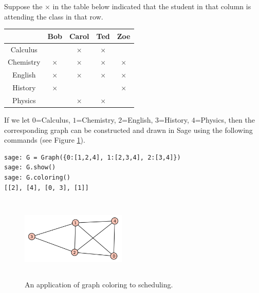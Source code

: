 \begin{example}
\label{eg:coloring}
Suppose the $\times$ in the table below
indicated that the student in that column is attending the class in that
row.

\begin{center}
\begin{tabular}{c|cccc}
                  &  Bob            &  Carol         &       Ted      &    Zoe   \\ \hline
Calculus          &                 &    $\times$   &  $\times$      &           \\
Chemistry        &    $\times$     &   $\times$   &    $\times$   &    $\times$   \\
English            &    $\times$     &   $\times$   &    $\times$   &    $\times$   \\
History          &    $\times$     &              &             &    $\times$     \\
Physics          &                    &    $\times$  &    $\times$    &    \\  \hline

\end{tabular}
\end{center}

If we let $0$=Calculus, $1$=Chemistry, $2$=English,
$3$=History, $4$=Physics, then the corresponding graph can be
constructed and drawn in Sage using the following commands
(see Figure \ref{fig:graph-coloring-scheduling}).

\begin{lstlisting}
sage: G = Graph({0:[1,2,4], 1:[2,3,4], 2:[3,4]})
sage: G.show()
sage: G.coloring()
[[2], [4], [0, 3], [1]]
\end{lstlisting}


\begin{figure}[h!]
\begin{center}
\includegraphics[height=4cm,width=5cm]{image/graph-coloring/graph-coloring-scheduling}
\end{center}
\caption{An application of graph coloring to scheduling.}
\label{fig:graph-coloring-scheduling}
\end{figure}
\end{example}


